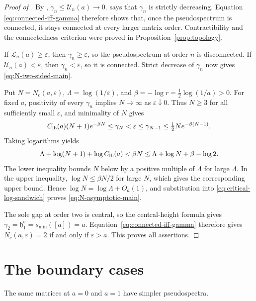 \documentclass[preprints,article,accept,oneauthor]{Definitions/mdpi}
\numberwithin{equation}{section}
\theoremstyle{mdpi}
\theoremstyle{definition}
\begin{document}
\begin{proof}[Proof of ]
By ,
\(\gamma_n\leq\mathcal U_n(a)\to0\).   says that
\(\gamma_n\) is strictly decreasing.  Equation
\eqref{eq:connected-iff-gamma} therefore shows that, once the
pseudospectrum is connected, it stays connected at every larger matrix
order.  Contractibility and the connectedness criterion were proved in
Proposition~\ref{prop:topology}.

If \(\mathcal L_n(a)\geq\varepsilon\), then
\(\gamma_n\geq\varepsilon\), so the pseudospectrum at order \(n\)
is disconnected.  If \(\mathcal U_n(a)<\varepsilon\), then
\(\gamma_n<\varepsilon\), so it is connected.  Strict decrease of
\(\gamma_n\) now gives \eqref{eq:N-two-sided-main}.

Put \(N=N_c(a,\varepsilon)\), \(\Lambda=\log(1/\varepsilon)\), and
\(\beta=-\log r=\tfrac12\log(1/a)>0\).
For fixed \(a\), positivity of every \(\gamma_n\) implies
\(N\to\infty\) as \(\varepsilon\downarrow0\).  Thus \(N\geq3\) for
all sufficiently small \(\varepsilon\), and minimality of \(N\) gives
\[
 C_{\rm lb}(a)(N+1)e^{-\beta N}
 \leq\gamma_N<\varepsilon\leq\gamma_{N-1}
 \leq\tfrac12Ne^{-\beta(N-1)}.
\]
Taking logarithms yields
\begin{equation}\label{eq:critical-log-sandwich}
 \Lambda+\log(N+1)+\log C_{\rm lb}(a)
 <\beta N\leq\Lambda+\log N+\beta-\log2.
\end{equation}
The lower inequality bounds \(N\) below by a positive multiple of
\(\Lambda\) for large \(\Lambda\).  In the upper inequality,
\(\log N\leq\beta N/2\) for large \(N\), which gives the corresponding
upper bound.  Hence \(\log N=\log\Lambda+O_a(1)\), and substitution into
\eqref{eq:critical-log-sandwich} proves \eqref{eq:N-asymptotic-main}.

The sole gap at order two is central, so the central-height formula gives
\(\gamma_2=\mathfrak h_1^{\mathrm e}=s_{\min}([a])=a\).
Equation~\eqref{eq:connected-iff-gamma} therefore gives
\(N_c(a,\varepsilon)=2\) if and only if \(\varepsilon>a\).
This proves all assertions.
\end{proof}



\section{The boundary cases}
\label{sec:boundaries}

The same matrices at \(a=0\) and \(a=1\) have simpler pseudospectra.
\end{document}
